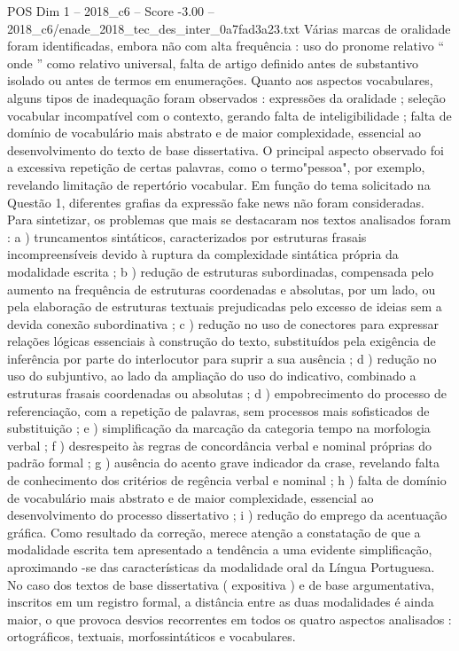 \begin{textsample}{POS Dim 1 – 2018\_c6 – Score -3.00 – 2018\_c6/enade\_2018\_tec\_des\_inter\_0a7fad3a23.txt}
Várias marcas de oralidade foram identificadas, embora não com alta frequência : uso do pronome relativo “ onde ” como relativo universal, falta de artigo definido antes de substantivo isolado ou antes de termos em enumerações.
Quanto aos aspectos vocabulares, alguns tipos de inadequação foram observados : expressões da oralidade ; seleção vocabular incompatível com o contexto, gerando falta de inteligibilidade ; falta de domínio de vocabulário mais abstrato e de maior complexidade, essencial ao desenvolvimento do texto de base dissertativa.
O principal aspecto observado foi a excessiva repetição de certas palavras, como o termo"pessoa", por exemplo, revelando limitação de repertório vocabular.
Em função do tema solicitado na Questão 1, diferentes grafias da expressão fake news não foram consideradas.
Para sintetizar, os problemas que mais se destacaram nos textos analisados foram : a ) truncamentos sintáticos, caracterizados por estruturas frasais incompreensíveis devido à ruptura da complexidade sintática própria da modalidade escrita ; b ) redução de estruturas subordinadas, compensada pelo aumento na frequência de estruturas coordenadas e absolutas, por um lado, ou pela elaboração de estruturas textuais prejudicadas pelo excesso de ideias sem a devida conexão subordinativa ; c ) redução no uso de conectores para expressar relações lógicas essenciais à construção do texto, substituídos pela exigência de inferência por parte do interlocutor para suprir a sua ausência ; d ) redução no uso do subjuntivo, ao lado da ampliação do uso do indicativo, combinado a estruturas frasais coordenadas ou absolutas ; d ) empobrecimento do processo de referenciação, com a repetição de palavras, sem processos mais sofisticados de substituição ; e ) simplificação da marcação da categoria tempo na morfologia verbal ; f ) desrespeito às regras de concordância verbal e nominal próprias do padrão formal ; g ) ausência do acento grave indicador da crase, revelando falta de conhecimento dos critérios de regência verbal e nominal ; h ) falta de domínio de vocabulário mais abstrato e de maior complexidade, essencial ao desenvolvimento do processo dissertativo ; i ) redução do emprego da acentuação gráfica.
Como resultado da correção, merece atenção a constatação de que a modalidade escrita tem apresentado a tendência a uma evidente simplificação, aproximando -se das características da modalidade oral da Língua Portuguesa.
No caso dos textos de base dissertativa ( expositiva ) e de base argumentativa, inscritos em um registro formal, a distância entre as duas modalidades é ainda maior, o que provoca desvios recorrentes em todos os quatro aspectos analisados : ortográficos, textuais, morfossintáticos e vocabulares.

\end{textsample}
